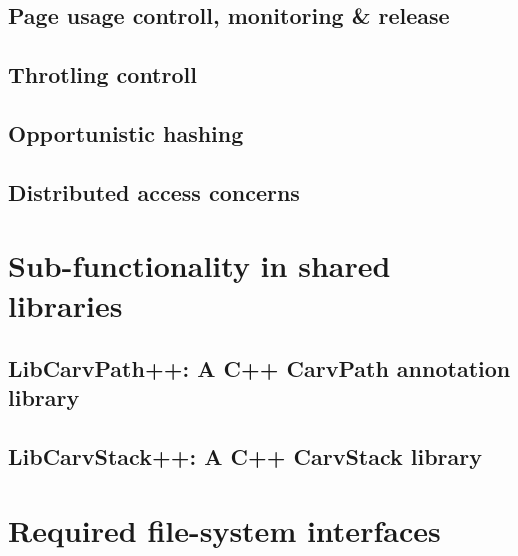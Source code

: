 \subsection{Page usage controll, monitoring \& release}
\subsection{Throtling controll}
\subsection{Opportunistic hashing}
\subsection{Distributed access concerns}
\section{Sub-functionality in shared libraries}
\subsection{LibCarvPath++: A C++ CarvPath annotation library}
\subsection{LibCarvStack++: A C++ CarvStack library}
\section{Required file-system interfaces}
